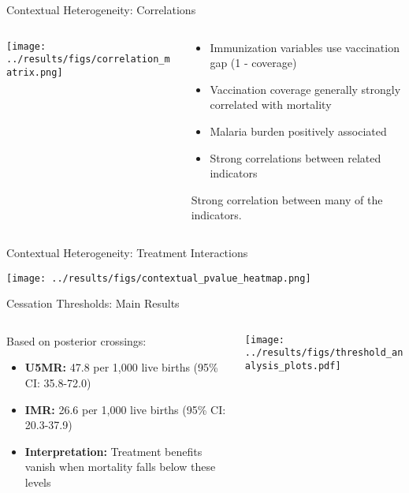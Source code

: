 \documentclass[aspectratio=169]{beamer}\usepackage[]{graphicx}\usepackage[dvipsnames]{xcolor}
\begin{document}
\begin{frame}{Contextual Heterogeneity: Correlations}
\begin{columns}
\begin{column}{0.5\textwidth}
\begin{center}
\texttt{[image: ../results/figs/correlation\_matrix.png]}
\end{center}
\end{column}
\begin{column}{0.5\textwidth}
\begin{itemize}
  \item Immunization variables use vaccination gap (1 - coverage) 
  \item Vaccination coverage generally strongly correlated with mortality
  \item Malaria burden positively associated
  \item Strong correlations between related indicators
\end{itemize}
Strong correlation between many of the indicators.
\end{column}
\end{columns}
\end{frame}

\begin{frame}{Contextual Heterogeneity: Treatment Interactions}
\begin{center}
\texttt{[image: ../results/figs/contextual\_pvalue\_heatmap.png]}
\end{center}
\end{frame}

\begin{frame}{Cessation Thresholds: Main Results}
\begin{columns}
\begin{column}{0.35\textwidth}

Based on posterior crossings:
\begin{itemize}
\item \textbf{U5MR:} 47.8 per 1,000 live births (95\% CI: 35.8-72.0)
\item \textbf{IMR:} 26.6 per 1,000 live births (95\% CI: 20.3-37.9)
\item \textbf{Interpretation:} Treatment benefits vanish when mortality falls below these levels
\end{itemize}
\end{column}
\begin{column}{0.65\textwidth}
\begin{center}
\texttt{[image: ../results/figs/threshold\_analysis\_plots.pdf]}
\end{center}
\end{column}
\end{columns}
\end{frame}
\end{document}
